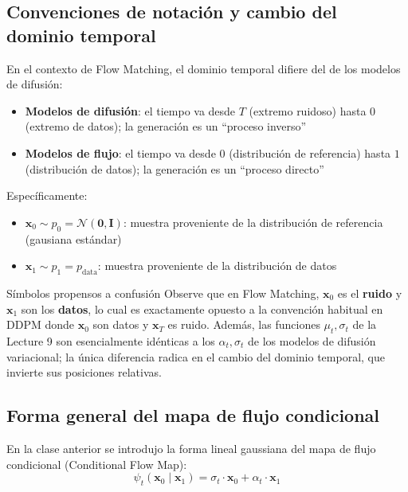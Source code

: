 \subsection{Convenciones de notación y cambio del dominio temporal}

En el contexto de Flow Matching, el dominio temporal difiere del de los modelos de difusión:

\begin{itemize}
    \item \textbf{Modelos de difusión}: el tiempo va desde $T$ (extremo ruidoso) hasta $0$ (extremo de datos); la generación es un ``proceso inverso''
    \item \textbf{Modelos de flujo}: el tiempo va desde $0$ (distribución de referencia) hasta $1$ (distribución de datos); la generación es un ``proceso directo''
\end{itemize}

Específicamente:
\begin{itemize}
    \item $\mathbf{x}_0 \sim p_0 = \mathcal{N}(\mathbf{0}, \mathbf{I})$: muestra proveniente de la distribución de referencia (gausiana estándar)
    \item $\mathbf{x}_1 \sim p_1 = p_{\text{data}}$: muestra proveniente de la distribución de datos
\end{itemize}

\begin{warningbox}{Símbolos propensos a confusión}
Observe que en Flow Matching, $\mathbf{x}_0$ es el \textbf{ruido} y $\mathbf{x}_1$ son los \textbf{datos}, lo cual es exactamente opuesto a la convención habitual en DDPM donde $\mathbf{x}_0$ son datos y $\mathbf{x}_T$ es ruido. Además, las funciones $\mu_t, \sigma_t$ de la Lecture 9 son esencialmente idénticas a los $\alpha_t, \sigma_t$ de los modelos de difusión variacional; la única diferencia radica en el cambio del dominio temporal, que invierte sus posiciones relativas.
\end{warningbox}

\subsection{Forma general del mapa de flujo condicional}

En la clase anterior se introdujo la forma lineal gaussiana del mapa de flujo condicional (Conditional Flow Map):
$$\psi_t(\mathbf{x}_0 \mid \mathbf{x}_1) = \sigma_t \cdot \mathbf{x}_0 + \alpha_t \cdot \mathbf{x}_1$$

